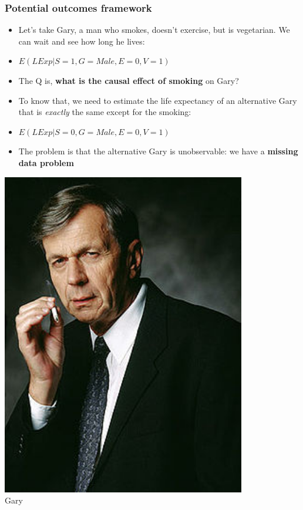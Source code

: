 \documentclass[aspectratio=43]{beamer}
\begin{document}
\begin{frame}
\frametitle{Potential outcomes framework}
\centering


\begin{minipage}{0.7\textwidth}\centering
  \begin{itemize}
    \item<1-> Let's take Gary, a man who smokes, doesn't exercise, but is vegetarian. We can wait and see how long he lives:
    \item<1->[] {\small $E(LExp|S=1, G=Male, E=0, V=1)$}
    \item<2-> The Q is, \textbf{what is the causal effect of smoking} on Gary?
    \item<3-> To know that, we need to estimate the life expectancy of an alternative Gary that is \textit{exactly} the same except for the smoking:
    \item<3->[] {\small $E(LExp|S=0, G=Male, E=0, V=1)$}
    \item<4-> The problem is that the alternative Gary is unobservable: we have a \textbf{missing data problem}
  \end{itemize}
\end{minipage}\hfill
\begin{minipage}{0.3\textwidth}\centering
\includegraphics[width = 0.8\textwidth]{../img/smoking_man}\\Gary
\end{minipage}


\end{frame}
\end{document}
